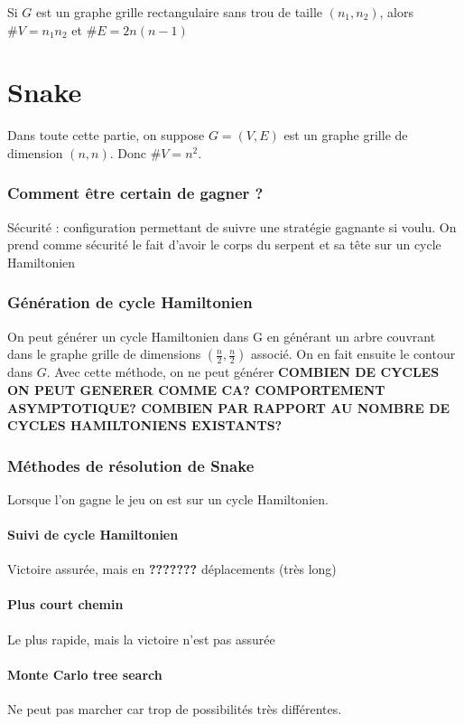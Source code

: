 \documentclass{article}
\begin{document}
Si $G$ est un graphe grille rectangulaire sans trou de taille $(n_{1},n_{2})$, alors $\#V=n_{1}n_{2}$ et $\#E=2n(n-1)$




\part{Snake}
Dans toute cette partie, on suppose $G=(V,E)$ est un graphe grille de dimension $(n,n)$. Donc $\# V=n^{2}$.

\section{Comment être certain de gagner ?}
Sécurité : configuration permettant de suivre une stratégie gagnante si voulu.
On prend comme sécurité le fait d'avoir le corps du serpent et sa tête sur un cycle Hamiltonien

\section{Génération de cycle Hamiltonien}
On peut générer un cycle Hamiltonien dans G en générant un arbre couvrant dans le graphe grille de dimensions $(\frac{n}{2},\frac{n}{2})$ associé. On en fait ensuite le contour dans $G$. Avec cette méthode, on ne peut générer \textbf{COMBIEN DE CYCLES ON PEUT GENERER COMME CA? COMPORTEMENT ASYMPTOTIQUE? COMBIEN PAR RAPPORT AU NOMBRE DE CYCLES HAMILTONIENS EXISTANTS?} 

\section{Méthodes de résolution de Snake}

Lorsque l'on gagne le jeu on est sur un cycle Hamiltonien.

\subsection{Suivi de cycle Hamiltonien}
Victoire assurée, mais en \textbf{???????} déplacements (très long)

\subsection{Plus court chemin}
Le plus rapide, mais la victoire n'est pas assurée

\subsection{Monte Carlo tree search}
Ne peut pas marcher car trop de possibilités très différentes.
\end{document}
